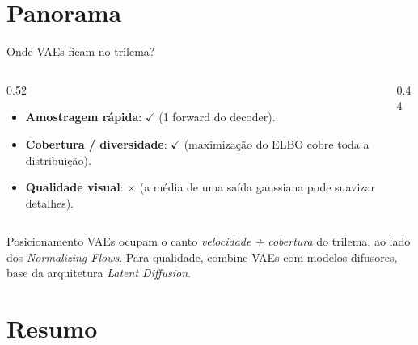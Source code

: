 \documentclass[aspectratio=169,xcolor=dvipsnames]{beamer}
\begin{document}
  \section{Panorama}

  \begin{frame}{Onde VAEs ficam no trilema?}
    \begin{columns}[T]
      \begin{column}{0.52\textwidth}
        \begin{itemize}
          \item \textbf{Amostragem rápida}: $\checkmark$ (1 forward do
          decoder).
          \item \textbf{Cobertura / diversidade}: $\checkmark$
          (maximização do ELBO cobre toda a distribuição).
          \item \textbf{Qualidade visual}: $\times$ (a média de uma
          saída gaussiana pode suavizar detalhes).
        \end{itemize}
        \vspace{0.4em}
      \end{column}
      \begin{column}{0.44\textwidth}
        \centering
        \resizebox{\linewidth}{!}{\generativetrilemma[vaenf]}
      \end{column}
    \end{columns}
    \begin{block}{Posicionamento}
      VAEs ocupam o canto \emph{velocidade + cobertura} do trilema,
      ao lado dos \textit{Normalizing Flows}. Para qualidade,
      combine VAEs com modelos difusores, base da arquitetura
      \textit{Latent Diffusion}.
    \end{block}
  \end{frame}

  \section*{Resumo}
\end{document}
